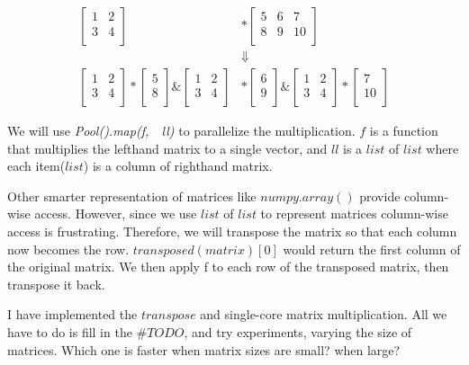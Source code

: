 \documentclass{article}
\begin{document}
\begin{align*}
  \begin{bmatrix}
    1 & 2\\
    3 & 4\\
  \end{bmatrix}
  &*
  \begin{bmatrix}
    5 & 6 & 7\\
    8 & 9 & 10\\
  \end{bmatrix}\\
  &\Downarrow\\
  \begin{bmatrix}
    1 & 2\\
    3 & 4\\
  \end{bmatrix}
  *
  \begin{bmatrix}
    5\\
    8\\
  \end{bmatrix}
  \&
  \begin{bmatrix}
    1 & 2\\
    3 & 4\\
  \end{bmatrix}
  &*
  \begin{bmatrix}
    6\\
    9\\
  \end{bmatrix}
  \&
  \begin{bmatrix}
    1 & 2\\
    3 & 4\\
  \end{bmatrix}
  *
  \begin{bmatrix}
    7\\
    10\\
  \end{bmatrix}
\end{align*}

We will use \textit{Pool().map(f,\ \ ll)} to parallelize the multiplication.
$f$ is a function that multiplies the lefthand matrix to a single
vector, and $ll$ is a $list$ of $list$ where each item($list$) is a column of
righthand matrix.

Other smarter representation of matrices like $numpy.array()$ provide column-wise
access. However, since we use $list$ of $list$ to represent matrices
column-wise access is frustrating. Therefore, we will transpose the matrix
so that each column now becomes the row. $transposed(matrix)[0]$ would return the
first column of the original matrix. We then apply f to each row of the
transposed matrix, then transpose it back.

I have implemented the $transpose$ and single-core matrix multiplication.
All we have to do is fill in the $\#TODO$, and try experiments, varying the size
of matrices. Which one is faster when matrix sizes are small? when large?
\end{document}
